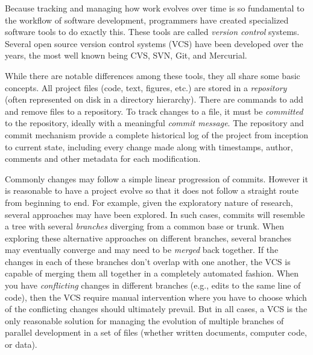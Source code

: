 \documentclass[ChapterTOCs,krantz2]{krantz} %
\begin{document}
Because tracking and managing how work evolves over time is so fundamental to
the workflow of software development, programmers have created specialized
software tools to do exactly this. These tools are called \emph{version
  control} systems. Several open source version control systems (VCS) have been
developed over the years, the most well known being CVS, SVN, Git, and
Mercurial.

While there are notable differences among these tools, they all share some
basic concepts.  All project files (code,
text, figures, etc.) are stored in a \emph{repository} (often represented on disk in a
directory hierarchy).  There are commands to add and remove files to a
repository.  To track changes to a file, it must be \emph{committed} to the repository,
ideally with a meaningful \emph{commit message}.  The
repository and commit mechanism provide a complete historical log of the
project from inception to current state, including every change made along with
timestamps, author, comments and other metadata for each modification.

Commonly changes may follow a simple linear progression of commits.
However it is reasonable to have a project evolve so that it does not follow a
straight route from beginning to end. For example, given the exploratory nature
of research, several approaches may have been explored. In such cases, commits will resemble a tree with several
\emph{branches} diverging from a common base or trunk. When exploring these
alternative approaches on different branches, several
branches may eventually converge and may need to be \emph{merged} back together.  If the changes in each of these branches don't overlap
with one another, the VCS is capable of merging them all together in a
completely automated fashion.  When you have \emph{conflicting} changes in
different branches (e.g., edits to the same line of code), then the VCS
require manual intervention where you have to choose which of the conflicting
changes should ultimately prevail.  But in all cases, a VCS is the only
reasonable solution for managing the evolution of multiple branches of parallel
development in a set of files (whether written documents, computer code, or
data).
\end{document}
